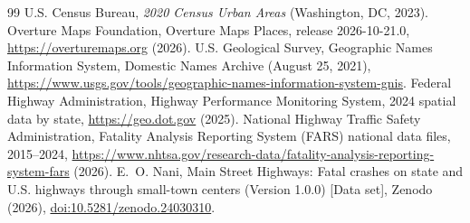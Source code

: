 \documentclass[11pt,letterpaper]{article}
\newcommand{\doi}[1]{\href{https://doi.org/#1}{doi:#1}}
\begin{document}
\begin{thebibliography}{99}
 U.S. Census Bureau, \emph{2020 Census Urban Areas} (Washington, DC, 2023).
 Overture Maps Foundation, Overture Maps Places, release 2026-10-21.0, \url{https://overturemaps.org} (2026).
 U.S. Geological Survey, Geographic Names Information System, Domestic Names Archive (August 25, 2021), \url{https://www.usgs.gov/tools/geographic-names-information-system-gnis}.
 Federal Highway Administration, Highway Performance Monitoring System, 2024 spatial data by state, \url{https://geo.dot.gov} (2025).
 National Highway Traffic Safety Administration, Fatality Analysis Reporting System (FARS) national data files, 2015--2024, \url{https://www.nhtsa.gov/research-data/fatality-analysis-reporting-system-fars} (2026).
 E.~O. Nani, Main Street Highways: Fatal crashes on state and U.S. highways through small-town centers (Version 1.0.0) [Data set], Zenodo (2026), \doi{10.5281/zenodo.24030310}.
\end{thebibliography}
\end{document}
